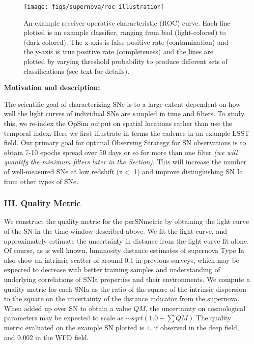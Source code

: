 \begin{figure}
\centering
\texttt{[image: figs/supernova/roc\_illustration]}
\label{fig:roc}
\caption{An example receiver operative characteristic (ROC) curve. Each
line plotted is an example classifier, ranging from bad (light-colored)
to (dark-colored). The x-axis is false positive rate (contamination) and
the y-axis is true positive rate (completeness) and the lines are
plotted by varying threshold probability to produce different sets of
classifications (see text for details).}
\end{figure}


{\bf Motivation and description:}

The scientific goal of characterizing SNe is to a large extent dependent
on how well the light curves of individual SNe are sampled in time and
filters. To study this, we re-index the OpSim output on spatial
locations rather than use the temporal index. Here we first illustrate
in terms the cadence in an example LSST field. Our primary goal for
optimal Observing Strategy for SN observations is to obtain 7-10 epochs
spread over 50 days or so for more than one filter {\it (we will
quantify the minimum filters later in the Section)}. This will increase
the number of well-measured SNe at low redshift (z$<$ 1) and improve
distinguishing SN Ia from other types of SNe.


\subsubsection{III. Quality Metric}

We construct the quality metric for the perSNmetric by obtaining the
light curve of the SN in the time window described above. We fit the
light curve, and approximately estimate the uncertainty in distance from
the light curve fit alone. Of course, as is well known, luminosity
distance estimates of supernova Type Ia also show an intrinsic scatter
of around $0.1$ in previous surveys, which may be expected to decrease
with better training samples and understanding of underlying
correlations of SNIa properties and their environments. We compute a
quality metric for each SNIa as the ratio of the square of the intrinsic
dispersion to the square on the 
uncertainty of the distance indicator from the supernova.
 When added up over SN to obtain a value
$QM$, the uncertainty on cosmological parameters may be expected to
scale as $\sim sqrt(1.0 + \sum QM)$ The quality metric evaluated on the
example SN plotted is $1.$ if observed in the deep field, and $0.002$ in
the WFD field.

